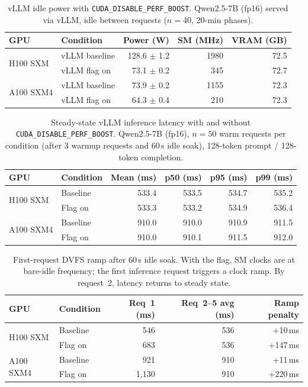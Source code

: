 \documentclass[sigconf,nonacm]{acmart}
\newcommand{\perfboost}{\texttt{CUDA\_\hspace{0pt}DISABLE\_\hspace{0pt}PERF\_\hspace{0pt}BOOST}}
\begin{document}
\begin{table}[t]
\caption{vLLM idle power with \perfboost. Qwen2.5-7B (fp16) served via vLLM, idle between requests ($n=40$, 20-min phases).}
\label{tab:vllm-idle}
\small
\begin{tabular}{@{}llrrr@{}}
\toprule
\textbf{GPU} & \textbf{Condition} & \textbf{Power (W)} & \textbf{SM (MHz)} & \textbf{VRAM (GB)} \\
\midrule
\multirow{2}{*}{H100 SXM} & vLLM baseline & 128.6 $\pm$ 1.2 & 1980 & 72.5 \\
 & vLLM flag on & 73.1 $\pm$ 0.2 & 345 & 72.7 \\
\midrule
\multirow{2}{*}{A100 SXM4} & vLLM baseline & 73.9 $\pm$ 0.2 & 1155 & 72.3 \\
 & vLLM flag on & 64.3 $\pm$ 0.4 & 210 & 72.3 \\
\bottomrule
\end{tabular}
\end{table}

\begin{table}[t]
\caption{Steady-state vLLM inference latency with and without \perfboost. Qwen2.5-7B (fp16), $n=50$ warm requests per condition (after 3 warmup requests and 60\,s idle soak), 128-token prompt / 128-token completion.}
\label{tab:latency}
\small
\begin{tabular}{@{}llrrrr@{}}
\toprule
\textbf{GPU} & \textbf{Condition} & \textbf{Mean (ms)} & \textbf{p50 (ms)} & \textbf{p95 (ms)} & \textbf{p99 (ms)} \\
\midrule
\multirow{2}{*}{H100 SXM} & Baseline & 533.4 & 533.5 & 534.7 & 535.2 \\
 & Flag on & 533.3 & 533.2 & 534.9 & 536.4 \\
\midrule
\multirow{2}{*}{A100 SXM4} & Baseline & 910.0 & 910.0 & 910.9 & 911.5 \\
 & Flag on & 910.0 & 910.1 & 911.5 & 912.0 \\
\bottomrule
\end{tabular}
\end{table}

\begin{table}[t]
\caption{First-request DVFS ramp after 60\,s idle soak. With the flag, SM clocks are at bare-idle frequency; the first inference request triggers a clock ramp. By request~2, latency returns to steady state.}
\label{tab:cold-ramp}
\small
\begin{tabular}{@{}llrrr@{}}
\toprule
\textbf{GPU} & \textbf{Condition} & \textbf{Req~1 (ms)} & \textbf{Req~2--5 avg (ms)} & \textbf{Ramp penalty} \\
\midrule
\multirow{2}{*}{H100 SXM} & Baseline & 546 & 536 & +10\,ms \\
 & Flag on & 683 & 536 & +147\,ms \\
\midrule
\multirow{2}{*}{A100 SXM4} & Baseline & 921 & 910 & +11\,ms \\
 & Flag on & 1{,}130 & 910 & +220\,ms \\
\bottomrule
\end{tabular}
\end{table}
\end{document}
